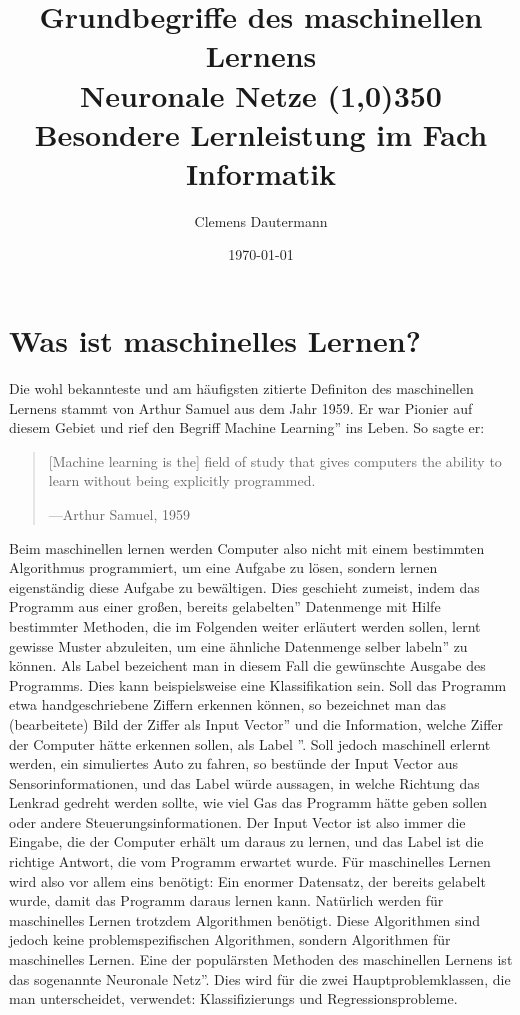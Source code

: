 \documentclass[11pt]{article}
\author{Clemens Dautermann}
\title{\Huge Grundbegriffe des maschinellen Lernens\\
	\bigskip
\huge Neuronale Netze \line(1,0){350}
\vspace*{10mm}
\Large Besondere Lernleistung im Fach Informatik
\vspace*{70mm}}
\date{\today{}}
\begin{document}
\biolinum
{}
\begin{titlepage}
	\maketitle
\end{titlepage}
\tableofcontents{}
\newpage

\section{Was ist maschinelles Lernen?}
Die wohl bekannteste und am häufigsten zitierte Definiton des maschinellen Lernens stammt von Arthur Samuel aus dem Jahr 1959. Er war Pionier auf diesem Gebiet und rief den Begriff \glqq Machine Learning'' ins Leben. So sagte er:
\begin{quote}
	[Machine learning is the] field of study that gives computers the ability to learn without being explicitly programmed\cite{1}.
	\begin{flushright}
		---Arthur Samuel, 1959
	\end{flushright}
\end{quote}
Beim maschinellen lernen werden Computer also nicht mit einem bestimmten Algorithmus programmiert, um eine Aufgabe zu lösen, sondern lernen eigenständig diese Aufgabe zu bewältigen. Dies geschieht zumeist, indem das Programm aus einer großen, bereits \glqq gelabelten'' Datenmenge mit Hilfe bestimmter Methoden, die im Folgenden weiter erläutert werden sollen, lernt gewisse Muster abzuleiten,  um eine ähnliche Datenmenge selber \glqq labeln'' zu können.  Als Label bezeichent man in diesem Fall die gewünschte Ausgabe des Programms. Dies kann beispielsweise eine Klassifikation sein. Soll das Programm etwa handgeschriebene Ziffern erkennen können, so bezeichnet man das (bearbeitete) Bild der Ziffer als \glqq Input Vector'' und die Information, welche Ziffer der Computer hätte erkennen sollen, als \glqq Label ''. Soll jedoch maschinell erlernt werden, ein simuliertes Auto zu fahren, so bestünde der Input Vector aus Sensorinformationen, und das Label würde aussagen, in welche Richtung das Lenkrad gedreht werden sollte, wie viel Gas das Programm hätte geben sollen oder andere Steuerungsinformationen. Der Input Vector ist also immer die Eingabe, die der Computer erhält um daraus zu lernen, und das Label ist die richtige Antwort, die vom Programm erwartet wurde. Für maschinelles Lernen wird also vor allem eins benötigt: Ein enormer Datensatz, der bereits gelabelt wurde, damit das Programm daraus lernen kann.\newline
Natürlich werden für maschinelles Lernen trotzdem Algorithmen benötigt. Diese Algorithmen sind jedoch keine problemspezifischen Algorithmen, sondern Algorithmen für maschinelles Lernen. Eine der populärsten Methoden des maschinellen Lernens ist das sogenannte \glqq Neuronale Netz''. Dies wird für die zwei Hauptproblemklassen, die man unterscheidet, verwendet: Klassifizierungs und Regressionsprobleme. 
\end{document}
